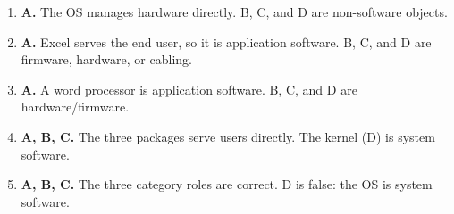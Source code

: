 \documentclass[11pt]{article}
\begin{document}
\begin{enumerate}[label=\textbf{Q\arabic*.}, leftmargin=*]
\item \textbf{A.} The OS manages hardware directly. B, C, and D are non-software objects.
\item \textbf{A.} Excel serves the end user, so it is application software. B, C, and D are firmware, hardware, or cabling.
\item \textbf{A.} A word processor is application software. B, C, and D are hardware/firmware.
\item \textbf{A, B, C.} The three packages serve users directly. The kernel (D) is system software.
\item \textbf{A, B, C.} The three category roles are correct. D is false: the OS is system software.
\end{enumerate}
\def\JKSSBLessonID{18}\def\JKSSBAnswers{1}
\end{document}
